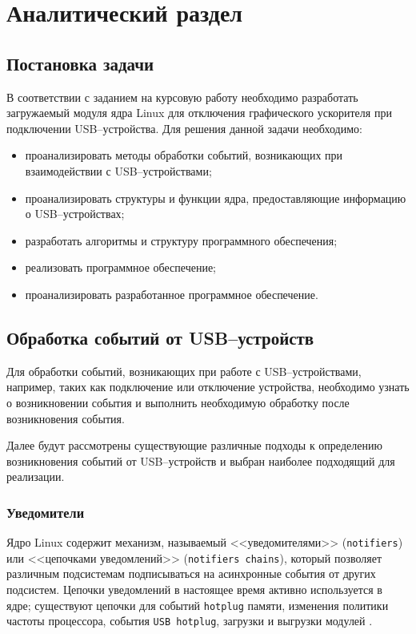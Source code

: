 \chapter{Аналитический раздел}

\section{Постановка задачи}

В соответствии с заданием на курсовую работу необходимо разработать загружаемый модуля ядра Linux для отключения графического ускорителя при подключении USB--устройства. Для решения данной задачи необходимо:

\begin{itemize}
	\item проанализировать методы обработки событий, возникающих при взаимодействии с USB--устройствами;
	\item проанализировать структуры и функции ядра, предоставляющие информацию о USB--устройствах;
	\item разработать алгоритмы и структуру программного обеспечения;
	\item реализовать программное обеспечение;
	\item проанализировать разработанное программное обеспечение.
\end{itemize}

\section{Обработка событий от USB--устройств}

Для обработки событий, возникающих при работе с USB--устройствами, например, таких как подключение или отключение устройства, необходимо узнать о возникновении события и выполнить необходимую обработку после возникновения события.

Далее будут рассмотрены существующие различные подходы к определению возникновения событий от USB--устройств и выбран наиболее подходящий для реализации.

\newpage
\subsection{Уведомители}

Ядро Linux содержит механизм, называемый <<уведомителями>> (\texttt{notifiers}) или <<цепочками уведомлений>> (\texttt{notifiers chains}), который позволяет различным подсистемам подписываться на асинхронные события от других подсистем. Цепочки уведомлений в настоящее время активно используется в ядре; существуют цепочки для событий \texttt{hotplug} памяти, изменения политики частоты процессора, события \texttt{USB hotplug}, загрузки и выгрузки модулей \cite{notifications}.

